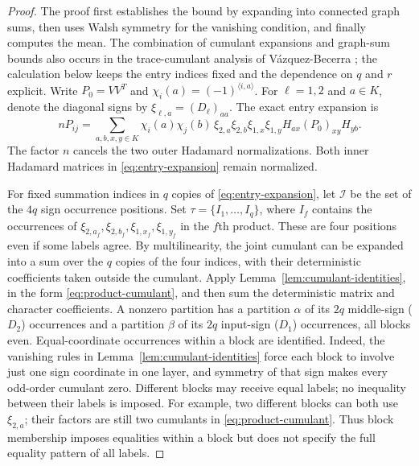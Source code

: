 \documentclass[11pt]{article}
\theoremstyle{definition}
\theoremstyle{remark}
\theoremstyle{plain}
\begin{document}
\begin{proof}
The proof first establishes the bound by expanding into connected graph sums,
then uses Walsh symmetry for the vanishing condition, and finally
computes the mean.
The combination of cumulant expansions and graph-sum bounds also
occurs in the trace-cumulant analysis of V\'azquez-Becerra
\cite[Section~4]{vazquez_becerra}; the calculation below keeps the
entry indices fixed and the dependence on $q$ and $r$ explicit.
Write \(P_0=VV^T\) and \(\chi_i(a)=(-1)^{\langle i,a\rangle}\).
For $\ell=1,2$ and $a\in K$, denote the diagonal signs by
$\xi_{\ell,a}=(D_\ell)_{aa}$. The exact entry expansion is
\begin{equation}\label{eq:entry-expansion}
 nP_{ij}=\sum_{a,b,x,y\in K}
 \chi_i(a)\chi_j(b)\,
 \xi_{2,a}\xi_{2,b}\xi_{1,x}\xi_{1,y}
                  H_{ax}(P_0)_{xy}H_{yb}.
\end{equation}
The factor \(n\) cancels the two outer Hadamard normalizations.
Both inner Hadamard matrices in \eqref{eq:entry-expansion} remain normalized.

For fixed summation indices in $q$ copies of
\eqref{eq:entry-expansion}, let $\mathcal I$ be the set of the
$4q$ sign occurrence positions. Set $\tau=\{I_1,\ldots,I_q\}$,
where $I_f$ contains the occurrences of
$\xi_{2,a_f},\xi_{2,b_f},\xi_{1,x_f},\xi_{1,y_f}$ in the
$f$th product. These are four positions even if some labels agree.
By multilinearity, the joint cumulant can be expanded into a sum over
the $q$ copies of the four indices, with their deterministic
coefficients taken outside the cumulant. Apply
Lemma~\ref{lem:cumulant-identities}, in the form
\eqref{eq:product-cumulant}, and then sum the deterministic
matrix and character coefficients. A nonzero partition
has a partition \(\alpha\) of its \(2q\) middle-sign ($D_2$) occurrences
and a partition \(\beta\) of its \(2q\) input-sign ($D_1$) occurrences,
all blocks even. Equal-coordinate occurrences within a block are identified.
Indeed, the vanishing rules in Lemma~\ref{lem:cumulant-identities}
force each block to involve just one sign
coordinate in one layer, and symmetry of that sign makes every
odd-order cumulant zero.
Different blocks may receive equal labels; no inequality between
their labels is imposed. For example, two different blocks can
both use $\xi_{2,a}$; their factors are still two cumulants in
\eqref{eq:product-cumulant}. Thus block membership imposes equalities
within a block but does not specify the full equality pattern of
all labels.


\end{proof}
\end{document}
